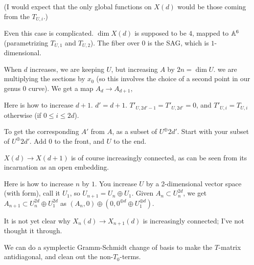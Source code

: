{(I would expect that the only global functions on $X(d)$ would be those coming from the $T_{U,i}$.)


Even this case is complicated.  $\dim X(d)$ is supposed to be $4$,
mapped to $\mathbb{A}^6$ (parametrizing $T_{U,1}$ and $T_{U,2}$). The fiber
over $0$ is the SAG, which is $1$-dimensional.
 


When $d$ increases, we are keeping $U$, but increasing $A$ by $2n=\dim U$.
we are multiplying the sections by $x_0$ (so this involves the choice of a
second point in our genus $0$ curve).  We get a map $\boxed{A_d} \rightarrow \boxed{A_{d+1}}$,

Here is how to increase $d+1$.
$d'=d+1$.  $T'_{U,2d'-1}=T'_{U,2d'}=0$, and $T'_{U,i}= T_{U,i}$ otherwise (if $0 \leq i \leq 2d$).

To get the corresponding $A'$ from $A$, as a subset of $U^\oplus{2d'}$.
Start with your subset of $U^\oplus{2d'}$.  Add $0$ to the front, and $U$ to the end.

$X(d) \rightarrow X(d+1)$ is of course increasingly connected, as can be seen from its incarnation as an open embedding.

Here is how to increase $n$ by $1$.  You increase $U$ by a 2-dimensional vector space (with form), call it $U_1$, so $U_{n+1} = U_{n} \oplus U_1$.   Given $A_n \subset U_n^{2d}$, we get
$A_{n+1} \subset U_n^{2d} \oplus U_1^{2d}$ as $(A_n,0) \oplus (0, 0^{\oplus d} \oplus U_1^{\oplus d})$.

It is not yet clear why $X_n(d) \rightarrow X_{n+1}(d)$ is increasingly connected; I've not thought it through.


We can do a symplectic Gramm-Schmidt change of basis to make the $T$-matrix antidiagonal, and clean out the non-$T_0$-terms.  

}

